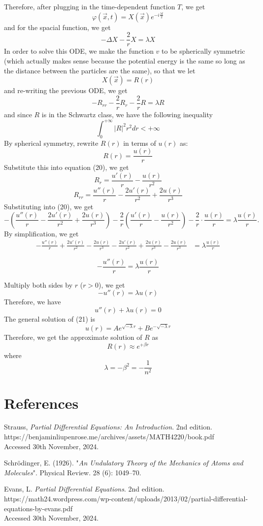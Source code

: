 \documentclass[a4paper,12pt]{report}
\begin{document}
Therefore, after plugging in the time-dependent function \(T\), we get 
\[\varphi(\vec{x}, t) = X(\vec{x}) e^{-i\frac{\lambda t}{2}}\]
and for the spacial function, we get 
\[-\Delta X - \frac{2}{r} X = \lambda X \tag{19}\]
In order to solve this ODE, we make the function \(v\) to be spherically symmetric (which actually makes sense because the potential energy is the same so long as the distance between the particles are the same), so that we let \[X(\vec{x}) = R(r)\]
and re-writing the previous ODE, we get
\[-R_{rr} - \frac{2}{r}R_r - \frac{2}{r}R = \lambda R \tag{20}\]
and since \(R\) is in the Schwartz class, we have the following inequality
\[\int_0^{+\infty} |R|^2 r^2 dr < +\infty \]
By spherical symmetry, rewrite \( R(r) \) in terms of \( u(r) \) as:
\[
R(r) = \frac{u(r)}{r}
\]
Substitute this into equation (20), we get 
\[
R_r = \frac{u'(r)}{r} - \frac{u(r)}{r^2} \]
\[R_{rr} = \frac{u''(r)}{r} - \frac{2u'(r)}{r^2} + \frac{2u(r)}{r^3}
\]
Substituting into (20), we get
\[
-\left( \frac{u''(r)}{r} - \frac{2u'(r)}{r^2} + \frac{2u(r)}{r^3} \right) 
- \frac{2}{r} \left( \frac{u'(r)}{r} - \frac{u(r)}{r^2} \right) 
- \frac{2}{r} \cdot \frac{u(r)}{r} = \lambda \frac{u(r)}{r}.
\]
By simplification, we get
\begin{align*}
-\frac{u''(r)}{r} + \frac{2u'(r)}{r^2} - \frac{2u(r)}{r^3}
- \frac{2u'(r)}{r^2} + \frac{2u(r)}{r^3}
- \frac{2u(r)}{r^3} &= \lambda \frac{u(r)}{r}
\end{align*}

\[
-\frac{u''(r)}{r} = \lambda \frac{u(r)}{r}
\]

Multiply both sides by \( r \) (\( r > 0 \)), we get
\[
-u''(r) = \lambda u(r)
\]
Therefore, we have
\[
u''(r) + \lambda u(r) = 0 \tag{21}
\]
The general solution of (21) is
\[
u(r) = A e^{\sqrt{-\lambda} r} + B e^{-\sqrt{-\lambda} r}
\]
Therefore, we get the approximate solution of \(R\) as \[R(r) \approx e^{+\beta r}\]
where 
\[\lambda = -\beta ^2 = -\frac{1}{n^2}\]
\section{References}
Strauss, \textit{Partial Differential Equations: An Introduction}. 2nd edition. \\https://benjaminliupenrose.me/archives/assets/MATH4220/book.pdf \\
Accessed 30th November, 2024. 

\noindent
Schrödinger, E. (1926). "\textit{An Undulatory Theory of the Mechanics of Atoms and Molecules}". Physical Review. 28 (6): 1049–70. 

\noindent
Evans, L. \textit{Partial Differential Equations}. 2nd edition. https://math24.wordpress.com/wp-content/uploads/2013/02/partial-differential-equations-by-evans.pdf \\
Accessed 30th November, 2024. 
\end{document}
